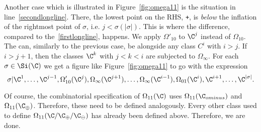 Another case which is illustrated in Figure~\ref{fig:omega11} is the situation in line~\eqref{secondlongline}. There, the lowest point on the RHS, \texttt{+}, is \emph{below} the inflation of the rightmost point of $\sigma$, i.e. $j < \sigma(|\sigma|)$. This is where the difference, compared to the~\eqref{firstlongline}, happens. We apply $\Omega'_{10}$ to $\C^j$ instead of $\Omega_{10}$. The \dtso can, similarly to the previous case, be alongside any class $C^i$ with $i > j$. If $i> j+1$, then the classes $\C^k$ with $j<k<i$ are subjected to $\Omega_\infty$. For each $\sigma \in \Si(\C)$ we get a figure like Figure~\ref{fig:omega11} to go with the expression $$\sigma\vert{\C^1,\ldots,\C^{j-1},\Omega'_{10}(\C^j),\Omega_\infty(\C^{j+1}),\ldots,\Omega_\infty(\C^{i-1}),\Omega_{01}(\C^i),\C^{i+1},\ldots,\C^{|\sigma|}}.$$

Of course, the combinatorial specification of $\Omega_{11}(\C)$ uses $\Omega_{11}(\C_{ominus})$ and $\Omega_{11}(\C_\oplus)$. Therefore, these need to be defined analogously. Every other class used to define $\Omega_{11}(\C/\C_\oplus/\C_\ominus)$ has already been defined above. Therefore, we are done.

